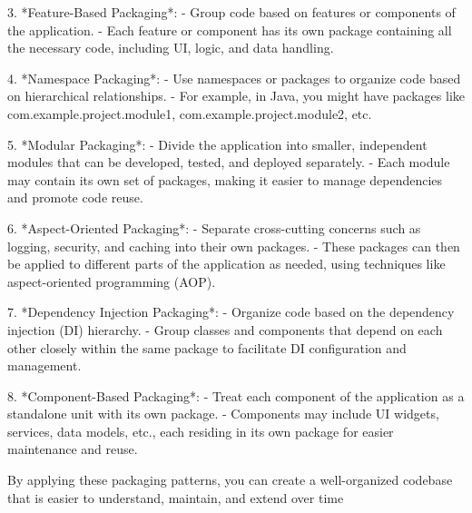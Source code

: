 3. *Feature-Based Packaging*:
- Group code based on features or components of the application.
- Each feature or component has its own package containing all the necessary code, including UI, logic, and data handling.

4. *Namespace Packaging*:
- Use namespaces or packages to organize code based on hierarchical relationships.
- For example, in Java, you might have packages like com.example.project.module1, com.example.project.module2, etc.

5. *Modular Packaging*:
- Divide the application into smaller, independent modules that can be developed, tested, and deployed separately.
- Each module may contain its own set of packages, making it easier to manage dependencies and promote code reuse.

6. *Aspect-Oriented Packaging*:
- Separate cross-cutting concerns such as logging, security, and caching into their own packages.
- These packages can then be applied to different parts of the application as needed, using techniques like aspect-oriented programming (AOP).

7. *Dependency Injection Packaging*:
- Organize code based on the dependency injection (DI) hierarchy.
- Group classes and components that depend on each other closely within the same package to facilitate DI configuration and management.

8. *Component-Based Packaging*:
- Treat each component of the application as a standalone unit with its own package.
- Components may include UI widgets, services, data models, etc., each residing in its own package for easier maintenance and reuse.

By applying these packaging patterns, you can create a well-organized codebase that is easier to understand, maintain, and extend over time